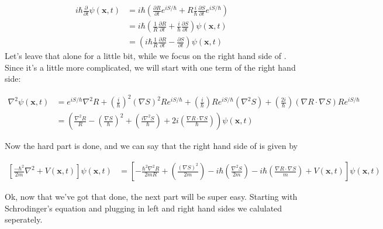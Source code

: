 $$
\begin{align*}
i\hbar\frac{\partial}{\partial t} \psi(\mathbf{x},t) &= i \hbar\left(\frac{\partial R}{\partial t} e^{i S / \hbar} + R \frac{i}{\hbar}\frac{\partial S}{\partial t} e^{i S / \hbar}\right)
\\ &= i \hbar \left(\frac{1}{R} \frac{\partial R}{\partial t} + \frac{i}{\hbar}\frac{\partial S}{\partial t}\right) \psi(\mathbf{x},t) 
\\ &= \left(i \hbar \frac{1}{R} \frac{\partial R}{\partial t} - \frac{\partial S}{\partial t}\right) \psi(\mathbf{x},t)
\end{align*}
$$
Let's leave that alone for a little bit, while we focus on the right hand side of . Since it's a little more complicated, we will start with one term of the right hand side:

$$
\begin{align*}
\nabla^2 \psi(\mathbf{x},t)  &= e^{i S / \hbar} \nabla^2 R + \left(\frac{i}{\hbar}\right)^2 (\nabla S)^2 R e^{i S / \hbar} + \left(\frac{i}{\hbar}\right) R e^{i S / \hbar} (\nabla^2 S) + \left(\frac{2i}{\hbar}\right) (\nabla R \cdot \nabla S) R e^{i S / \hbar}
\\ &= \left(\frac{\nabla^2 R}{R} - \left(\frac{\nabla S}{\hbar}\right)^2  + \left(\frac{i \nabla^2 S}{\hbar}\right) + 2 i \left(\frac{\nabla R \cdot \nabla S}{\hbar}\right) \right) \psi(\mathbf{x},t) 
\end{align*}
$$

Now the hard part is done, and we can say that the right hand side of  is given by 

$$
\begin{align*} 
\left [ \frac{-\hbar^2}{2 m}\nabla^2 + V(\mathbf{x},t)\right ]\psi(\mathbf{x},t) &= \left [-\frac{\hbar^2  \nabla^2 R}{2 m R} + \left(\frac{(\nabla S)^2}{2 m}\right)  - i \hbar \left(\frac{\nabla^2 S}{2 m}\right) - i \hbar \left(\frac{\nabla R \cdot \nabla S}{m}\right) + V(\mathbf{x},t) \right]\psi(\mathbf{x},t) 
\end{align*}
$$

Ok, now that we've got that done, the next part will be super easy. Starting with Schrodinger's equation and plugging in left and right hand sides we calulated seperately. 

